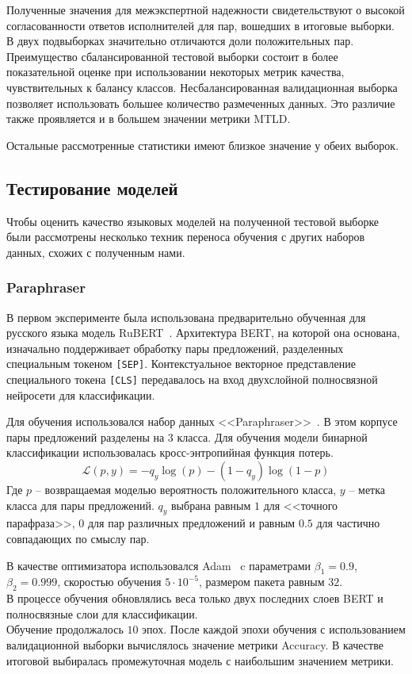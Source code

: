 \documentclass[a4paper,14pt]{extarticle}
\newcommand{\nocontentsline}[3]{}
\newcommand{\tocless}[2]{\bgroup\let\addcontentsline=\nocontentsline#1{#2}\egroup}
\begin{document}
Полученные значения для межэкспертной надежности свидетельствуют о высокой согласованности ответов исполнителей для пар, вошедших в итоговые выборки.\\
В двух подвыборках значительно отличаются доли положительных пар.
Преимущество сбалансированной тестовой выборки состоит в более показательной оценке при использовании некоторых метрик качества, чувствительных к балансу классов.
Несбалансированная валидационная выборка позволяет использовать большее количество размеченных данных.
Это различие также проявляется и в большем значении метрики \mbox{MTLD}.

Остальные рассмотренные статистики имеют близкое значение у обеих выборок.

\subsection{Тестирование моделей}
    Чтобы оценить качество языковых моделей на полученной тестовой выборке были рассмотрены несколько техник переноса обучения с других наборов данных, схожих с полученным нами.
\tocless\subsubsection{Paraphraser}\label{sssec:paraphraser}
    В первом эксперименте была использована предварительно обученная для русского языка модель \mbox{RuBERT}~\autocite{kuratov2019adaptation}.
    Архитектура \mbox{BERT}, на которой она основана, изначально поддерживает обработку пары предложений, разделенных специальным токеном \texttt{[SEP]}.
    Контекстуальное векторное представление специального токена \texttt{[CLS]} передавалось на вход двухслойной полносвязной нейросети для классификации.
    
    Для обучения использовался набор данных \mbox{<<Paraphraser>>}~\autocite{pivovarova2017paraphraser}. В этом корпусе пары предложений разделены на $3$ класса. Для обучения модели бинарной классификации использовалась кросс-энтропийная функция потерь.
    \begin{equation}
        \mathcal{L}(p, y) = -q_{y}\log{(p)} - (1 - q_{y}) \log{(1 - p)}
    \end{equation}
    Где $p$ -- возвращаемая моделью вероятность положительного класса, $y$ -- метка класса для пары предложений. $q_y$ выбрана равным $1$ для <<точного парафраза>>, $0$ для пар различных предложений и равным $0.5$ для частично совпадающих по смыслу пар.
    
    В качестве оптимизатора использовался \mbox{Adam}~\autocite{kingma2014adam} c параметрами ${\beta_1 = 0.9}$, ${\beta_2 = 0.999}$, скоростью обучения $5 \cdot 10^{-5}$, размером пакета равным $32$.\\
    В процессе обучения обновлялись веса только двух последних слоев \mbox{BERT} и полносвязные слои для классификации.\\
    Обучение продолжалось $10$ эпох.
    После каждой эпохи обучения с использованием валидационной выборки вычислялось значение метрики Accuracy. В качестве итоговой выбиралась промежуточная модель с наибольшим значением метрики.
    
\end{document}
